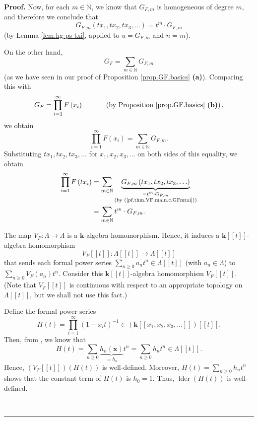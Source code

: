 \documentclass[numbers=enddot,12pt,final,onecolumn,notitlepage]{scrartcl}%
\theoremstyle{definition}
\newenvironment{proof}[1][Proof]{\noindent\textbf{#1.} }{\ \rule{0.5em}{0.5em}}
\let\sumnonlimits\sum
\let\prodnonlimits\prod
\renewcommand{\sum}{\sumnonlimits\limits}
\renewcommand{\prod}{\prodnonlimits\limits}
\newenvironment{verlong}{}{}
\begin{document}
\begin{verlong}
\begin{proof}
Now, for each $m\in\mathbb{N}$, we know that $G_{F,m}$ is homogeneous of
degree $m$, and therefore we conclude that%
\begin{equation}
G_{F,m}\left(  tx_{1},tx_{2},tx_{3},\ldots\right)  =t^{m}\cdot G_{F,m}
\label{pf.thm.VF.main.c.GFmtxi}%
\end{equation}
(by Lemma \ref{lem.hg-ps-txi}, applied to $u=G_{F,m}$ and $n=m$).

On the other hand,
\[
G_{F}=\sum_{m\in\mathbb{N}}G_{F,m}%
\]
(as we have seen in our proof of Proposition \ref{prop.GF.basics}
\textbf{(a)}). Comparing this with%
\[
G_{F}=\prod_{i=1}^{\infty}F\left(  x_{i}\right)  \ \ \ \ \ \ \ \ \ \ \left(
\text{by Proposition \ref{prop.GF.basics} \textbf{(b)}}\right)  ,
\]
we obtain%
\[
\prod_{i=1}^{\infty}F\left(  x_{i}\right)  =\sum_{m\in\mathbb{N}}G_{F,m}.
\]
Substituting $tx_{1},tx_{2},tx_{3},\ldots$ for $x_{1},x_{2},x_{3},\ldots$ on
both sides of this equality, we obtain%
\begin{align}
\prod_{i=1}^{\infty}F\left(  tx_{i}\right)   &  =\sum_{m\in\mathbb{N}%
}\underbrace{G_{F,m}\left(  tx_{1},tx_{2},tx_{3},\ldots\right)  }%
_{\substack{=t^{m}\cdot G_{F,m}\\\text{(by (\ref{pf.thm.VF.main.c.GFmtxi}))}%
}}\nonumber\\
&  =\sum_{m\in\mathbb{N}}t^{m}\cdot G_{F,m}. \label{pf.thm.VF.main.c.GFtxi}%
\end{align}


The map $V_{F}:\Lambda\rightarrow\Lambda$ is a $\mathbf{k}$-algebra
homomorphism. Hence, it induces a $\mathbf{k}\left[  \left[  t\right]
\right]  $-algebra homomorphism%
\[
V_{F}\left[  \left[  t\right]  \right]  :\Lambda\left[  \left[  t\right]
\right]  \rightarrow\Lambda\left[  \left[  t\right]  \right]
\]
that sends each formal power series $\sum_{n\geq0}a_{n}t^{n}\in\Lambda\left[
\left[  t\right]  \right]  $ (with $a_{n}\in\Lambda$) to $\sum_{n\geq0}%
V_{F}\left(  a_{n}\right)  t^{n}$. Consider this $\mathbf{k}\left[  \left[
t\right]  \right]  $-algebra homomorphism $V_{F}\left[  \left[  t\right]
\right]  $. (Note that $V_{F}\left[  \left[  t\right]  \right]  $ is
continuous with respect to an appropriate topology on $\Lambda\left[  \left[
t\right]  \right]  $, but we shall not use this fact.)

Define the formal power series
\[
H\left(  t\right)  =\prod_{i=1}^{\infty}\left(  1-x_{i}t\right)  ^{-1}%
\in\left(  \mathbf{k}\left[  \left[  x_{1},x_{2},x_{3},\ldots\right]  \right]
\right)  \left[  \left[  t\right]  \right]  .
\]
Then, from \cite[(2.4.1)]{GriRei}, we know that%
\[
H\left(  t\right)  =\sum_{n\geq0}\underbrace{h_{n}\left(  \mathbf{x}\right)
}_{=h_{n}}t^{n}=\sum_{n\geq0}h_{n}t^{n}\in\Lambda\left[  \left[  t\right]
\right]  .
\]
Hence, $\left(  V_{F}\left[  \left[  t\right]  \right]  \right)  \left(
H\left(  t\right)  \right)  $ is well-defined. Moreover, $H\left(  t\right)
=\sum_{n\geq0}h_{n}t^{n}$ shows that the constant term of $H\left(  t\right)
$ is $h_{0}=1$. Thus, $\operatorname*{lder}\left(  H\left(  t\right)  \right)
$ is well-defined.


\end{proof}
\end{verlong}
\end{document}
